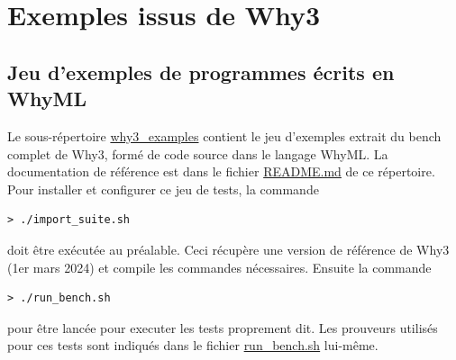 \documentclass[a4paper,11pt]{article}
\begin{document}


\section{Exemples issus de Why3}

\subsection{Jeu d'exemples de programmes écrits en WhyML}

Le sous-répertoire \url{why3_examples} contient le jeu d'exemples
extrait du bench complet de Why3, formé de code source dans le langage
WhyML. La documentation de référence est dans le fichier \url{README.md} de ce répertoire.
Pour installer et configurer ce jeu de tests, la commande
\begin{lstlisting}
> ./import_suite.sh
\end{lstlisting}
doit être exécutée au préalable. Ceci récupère une version de
référence de Why3 (1er mars 2024) et compile les commandes nécessaires. Ensuite la commande
\begin{lstlisting}
> ./run_bench.sh
\end{lstlisting}
pour être lancée pour executer les tests proprement dit. Les prouveurs
utilisés pour ces tests sont indiqués dans le fichier
\url{run_bench.sh} lui-même.
\end{document}
